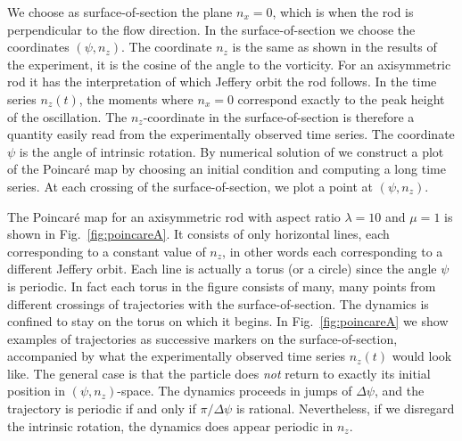 \documentclass[thesis.tex]{subfiles}
\begin{document}
We choose as surface-of-section the plane $n_x=0$, which is when the rod is perpendicular to the flow direction. In the surface-of-section we choose the coordinates $(\psi, n_z)$. The coordinate $n_z$ is the same as shown in the results of the experiment, it is the cosine of the angle to the vorticity. For an axisymmetric rod it has the interpretation of which Jeffery orbit the rod follows. In the time series $n_z(t)$, the moments where $n_x=0$ correspond exactly to the peak height of the oscillation. The $n_z$-coordinate in the surface-of-section is therefore a quantity easily read from the experimentally observed time series. The coordinate $\psi$ is the angle of intrinsic rotation. By numerical solution of  we construct a plot of the Poincar\'e map by choosing an initial condition and computing a long time series. At each crossing of the surface-of-section, we plot a point at $(\psi, n_z)$.

The Poincar\'e map for an axisymmetric rod with aspect ratio $\lambda=10$ and $\mu=1$ is shown in Fig.~\ref{fig:poincareA}. It consists of only horizontal lines, each corresponding to a constant value of $n_z$, in other words each corresponding to a different Jeffery orbit. Each line is actually a torus (or a circle) since the angle $\psi$ is periodic. In fact each torus in the figure consists of many, many points from different crossings of trajectories with the surface-of-section. The dynamics is confined to stay on the torus on which it begins. In Fig.~\ref{fig:poincareA} we show examples of trajectories as successive markers on the surface-of-section, accompanied by what the experimentally observed time series $n_z(t)$ would look like. The general case is that the particle does \emph{not} return to exactly its initial position in $(\psi, n_z)$-space. The dynamics proceeds in jumps of $\Delta \psi$, and the trajectory is periodic if and only if $\pi/\Delta \psi$ is rational. Nevertheless, if we disregard the intrinsic rotation, the dynamics does appear periodic in $n_z$.
\end{document}
